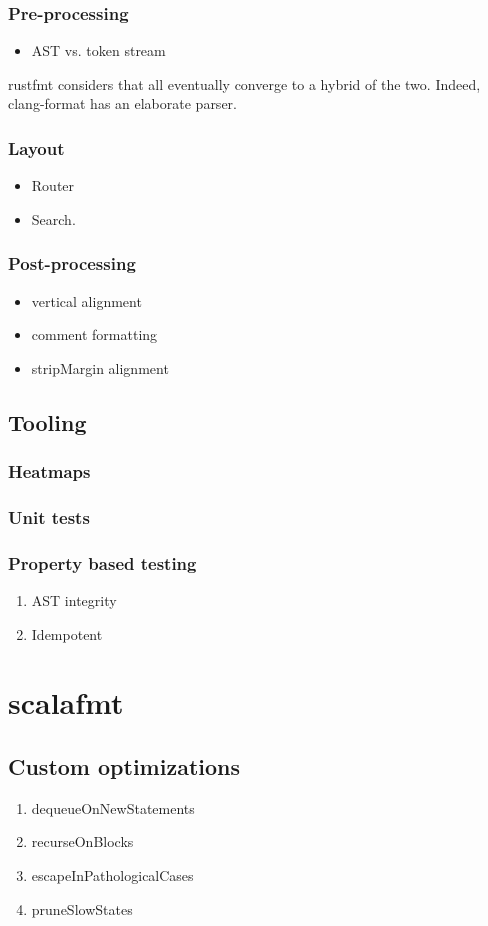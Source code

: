\documentclass[11pt,a4paper]{article}
\begin{document}
\subsubsection{Pre-processing}
 \begin{itemize}
   \item AST vs. token stream
 \end{itemize}
rustfmt considers that all eventually converge to a hybrid of the two.
Indeed, clang-format has an elaborate parser.
\subsubsection{Layout}
\begin{itemize}
  \item Router
  \item Search.
\end{itemize}
\subsubsection{Post-processing}
\begin{itemize}
  \item vertical alignment
  \item comment formatting
  \item stripMargin alignment
\end{itemize}
\subsection{Tooling}
\subsubsection{Heatmaps}
\subsubsection{Unit tests}
\subsubsection{Property based testing}
\begin{enumerate}
  \item AST integrity
  \item Idempotent
\end{enumerate}
\section{scalafmt}
\subsection{Custom optimizations}
\begin{enumerate}
  \item dequeueOnNewStatements
  \item recurseOnBlocks
  \item escapeInPathologicalCases
  \item pruneSlowStates
\end{enumerate}
\end{document}

